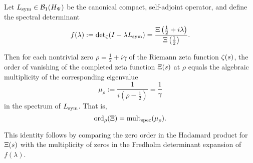 \begin{lemma}
\label{lem:hadamard_fredholm_multiplicity}
Let \( L_{\mathrm{sym}} \in \mathcal{B}_1(H_{\Psi}) \) be the canonical compact, self-adjoint operator, and define the spectral determinant
\[
f(\lambda) := \det\nolimits_\zeta(I - \lambda L_{\mathrm{sym}}) = \frac{\Xi\left(\tfrac{1}{2} + i\lambda\right)}{\Xi\left(\tfrac{1}{2}\right)}.
\]

Then for each nontrivial zero \( \rho = \tfrac{1}{2} + i\gamma \) of the Riemann zeta function \( \zeta(s) \), the order of vanishing of the completed zeta function \( \Xi(s) \) at \( \rho \) equals the algebraic multiplicity of the corresponding eigenvalue
\[
\mu_\rho := \frac{1}{i(\rho - \tfrac{1}{2})} = \frac{1}{\gamma}
\]
in the spectrum of \( L_{\mathrm{sym}} \). That is,
\[
\operatorname{ord}_\rho(\Xi) = \operatorname{mult}_{\mathrm{spec}}(\mu_\rho).
\]

\medskip
\noindent
This identity follows by comparing the zero order in the Hadamard product for \( \Xi(s) \) with the multiplicity of zeros in the Fredholm determinant expansion of \( f(\lambda) \).
\end{lemma}
